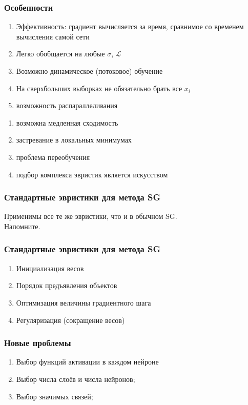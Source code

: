 \documentclass[12pt]{beamer}
\begin{document}
\begin{frame}\frametitle{Особенности}
\begin{enumerate}[+]
\item Эффективность: градиент вычисляется за время, сравнимое со временем вычисления самой сети
\item Легко обобщается на любые $\sigma$, $\mathcal{L}$
\item Возможно динамическое (потоковое) обучение
\item На сверхбольших выборках не обязательно брать все $x_i$
\item возможность распараллеливания
\end{enumerate}

\begin{enumerate}[--]
\item возможна медленная сходимость
\item застревание в локальных минимумах
\item проблема переобучения
\item подбор комплекса эвристик является искусством
\end{enumerate}
\end{frame}


\begin{frame}\frametitle{Стандартные эвристики для метода SG}
Применимы все те же эвристики, что и в обычном SG.\\

Напомните.
\end{frame}

\begin{frame}\frametitle{Стандартные эвристики для метода SG}
\begin{enumerate}[--]
\item Инициализация весов
\item Порядок предъявления объектов
\item Оптимизация величины градиентного шага
\item Регуляризация (сокращение весов)
\end{enumerate}
\end{frame}

\begin{frame}\frametitle{Новые проблемы}
\begin{enumerate}[--]
\item Выбор функций активации в каждом нейроне
\item Выбор числа слоёв и числа нейронов;
\item Выбор значимых связей;
\end{enumerate}
\end{frame}
\end{document}
